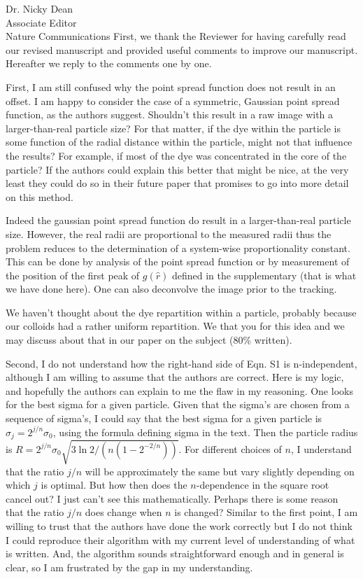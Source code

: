 \documentclass[a4paper, rebuttal, parskip=true, firsthead=false, fromemail=true, foldmarks=false]{scrlttr2}
\begin{document}
\begin{letter}{Dr. Nicky Dean\\
Associate Editor\\
Nature Communications}
First, we thank the Reviewer for having carefully read our revised manuscript and provided useful comments to improve our manuscript. Hereafter we reply to the comments one by one.

\begin{quotationi}
First, I am still confused why the point spread function does not result in an offset. I am happy to consider the case of a symmetric, Gaussian point spread function, as the authors suggest. Shouldn't this result in a raw image with a larger-than-real particle size? For that matter, if the dye within the particle is some function of the radial distance within the particle, might not that influence the results? For example, if most of the dye was concentrated in the core of the particle? If the authors could explain this better that might be nice, at the very least they could do so in their future paper that promises to go into more detail on this method.
\end{quotationi}

Indeed the gaussian point spread function do result in a larger-than-real particle size. However, the real radii are proportional to the measured radii thus the problem reduces to the determination of a system-wise proportionality constant. This can be done by analysis of the point spread function or by measurement of the position of the first peak of $g(\hat{r})$ defined in the supplementary (that is what we have done here). One can also deconvolve the image prior to the tracking.

We haven't thought about the dye repartition within a particle, probably because our colloids had a rather uniform repartition. We that you for this idea and we may discuss about that in our paper on the subject (80\% written).

\begin{quotationi}
Second, I do not understand how the right-hand side of Eqn. S1 is n-independent, although I am willing to assume that the authors are correct. Here is my logic, and hopefully the authors can explain to me the flaw in my reasoning. One looks for the best sigma for a given particle. Given that the sigma's are chosen from a sequence of sigma's, I could say that the best sigma for a given particle is $\sigma_j = 2^{j/n} \sigma_0$, using the formula defining sigma in the text. Then the particle radius is $R = 2^{j/n} \sigma_0 \sqrt{3 \ln 2 / (n (1-2^{-2/n}))}$. For different choices of $n$, I understand that the ratio $j/n$ will be approximately the same but vary slightly depending on which $j$ is optimal. But how then does the $n$-dependence in the square root cancel out? I just can't see this mathematically. Perhaps there is some reason that the ratio $j/n$ does change when $n$ is changed? Similar to the first point, I am willing to trust that the authors have done the work correctly but I do not think I could reproduce their algorithm with my current level of understanding of what is written. And, the algorithm sounds straightforward enough and in general is clear, so I am frustrated by the gap in my understanding.
\end{quotationi}


\end{letter}
\end{document}
